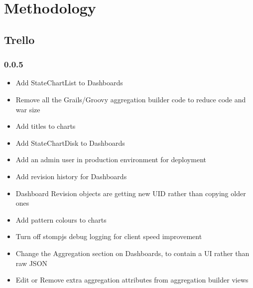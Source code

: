 
\chapter{Methodology}
\section{Trello}\subsection*{0.0.5}
\begin{itemize}
\item Add StateChartList to Dashboards
\item Remove all the Grails/Groovy aggregation builder code to reduce code and war size
\item Add titles to charts
\item Add StateChartDisk to Dashboards
\item Add an admin user in production environment for deployment
\item Add revision history for Dashboards
\item Dashboard Revision objects are getting new UID rather than copying older ones
\item Add pattern colours to charts
\item Turn off stompjs debug logging for client speed improvement
\item Change the Aggregation section on Dashboards, to contain a UI rather than raw JSON
\item Edit or Remove extra aggregation attributes from aggregation builder views
\end{itemize}
